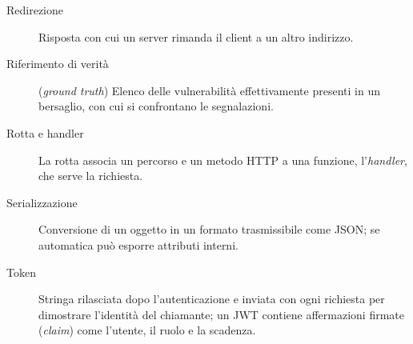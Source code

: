 {\begin{description}
  \item[Redirezione] Risposta con cui un server rimanda il client a un altro
  indirizzo.

  \item[Riferimento di verità] (\emph{ground truth}) Elenco delle vulnerabilità
  effettivamente presenti in un bersaglio, con cui si confrontano le
  segnalazioni.

  \item[Rotta e handler] La rotta associa un percorso e un metodo HTTP a una
  funzione, l'\emph{handler}, che serve la richiesta.

  \item[Serializzazione] Conversione di un oggetto in un formato trasmissibile
  come JSON; se automatica può esporre attributi interni.

  \item[Token] Stringa rilasciata dopo l'autenticazione e inviata con ogni
  richiesta per dimostrare l'identità del chiamante; un JWT contiene
  affermazioni firmate (\emph{claim}) come l'utente, il ruolo e la scadenza.
\end{description}
}

